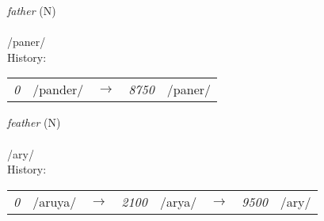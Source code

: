 \vspace{15pt}
\begin{nopagebreak}
 \textit{father} (N)\\
\\
\noindent /p{\textprimstress}aner/\\


\noindent History:

\vspace{-0pt}
\hspace{40pt}
\begin{tabular}{ccc}
\textit{0} & /pander/&$\rightarrow$ & \textit{8750} & /paner/& \\
\end{tabular}

\vspace{20pt}\hline

\end{nopagebreak}
\filbreak



\vspace{15pt}
\begin{nopagebreak}
 \textit{feather} (N)\\
\\
\noindent /{\textprimstress}ary/\\


\noindent History:

\vspace{-0pt}
\hspace{40pt}
\begin{tabular}{ccc}
\textit{0} & /aruya/&$\rightarrow$ & \textit{2100} & /arya/&$\rightarrow$ & \textit{9500} & /ary/& \\
\end{tabular}

\vspace{20pt}\hline

\end{nopagebreak}
\filbreak



